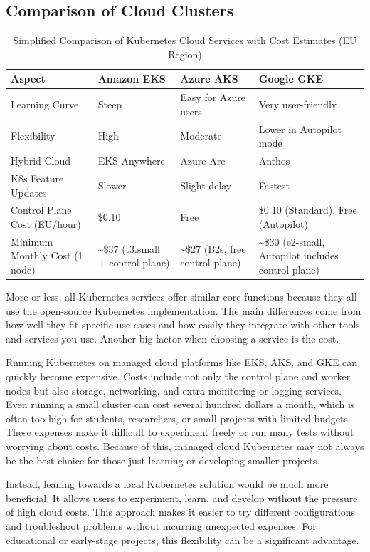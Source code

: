 \subsection{Comparison of Cloud Clusters}
\begin{table}[h]
\small
\centering
\begin{tabular}{|p{3cm}|p{3.5cm}|p{3.5cm}|p{3.5cm}|}
\hline
\textbf{Aspect} & \textbf{Amazon EKS} & \textbf{Azure AKS} & \textbf{Google GKE} \\
\hline
Learning Curve & Steep & Easy for Azure users & Very user-friendly \\
Flexibility & High & Moderate & Lower in Autopilot mode \\
Hybrid Cloud & EKS Anywhere & Azure Arc & Anthos \\
K8s Feature Updates & Slower & Slight delay & Fastest \\
Control Plane Cost (EU/hour) & \$0.10 & Free & \$0.10 (Standard), Free (Autopilot) \\
Minimum Monthly Cost (1 node) & \textasciitilde\$37 (t3.small + control plane) & \textasciitilde\$27 (B2s, free control plane) & \textasciitilde\$30 (e2-small, Autopilot includes control plane) \\
\hline
\end{tabular}
\caption{Simplified Comparison of Kubernetes Cloud Services with Cost Estimates (EU Region)}
\end{table}




More or less, all Kubernetes services offer similar core functions because they all use the open-source Kubernetes implementation. The main differences come from how well they fit specific use cases and how easily they integrate with other tools and services you use. Another big factor when choosing a service is the cost.

Running Kubernetes on managed cloud platforms like EKS, AKS, and GKE can quickly become expensive. Costs include not only the control plane and worker nodes but also storage, networking, and extra monitoring or logging services. Even running a small cluster can cost several hundred dollars a month, which is often too high for students, researchers, or small projects with limited budgets. These expenses make it difficult to experiment freely or run many tests without worrying about costs. Because of this, managed cloud Kubernetes may not always be the best choice for those just learning or developing smaller projects.

Instead, leaning towards a local Kubernetes solution would be much more beneficial. It allows users to experiment, learn, and develop without the pressure of high cloud costs. This approach makes it easier to try different configurations and troubleshoot problems without incurring unexpected expenses. For educational or early-stage projects, this flexibility can be a significant advantage.

